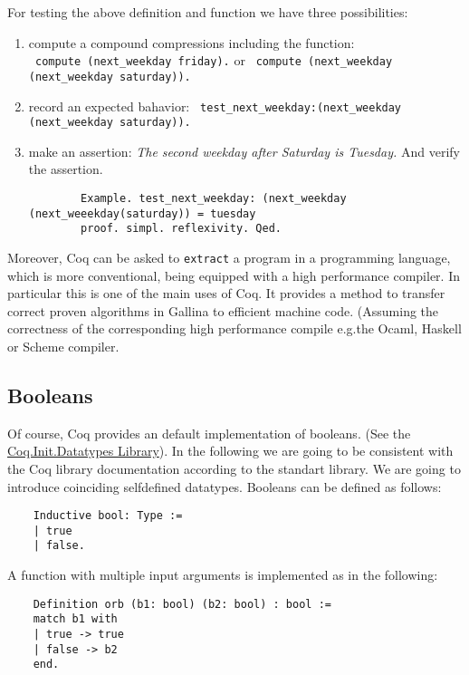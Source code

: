   For testing the above definition and function we have three possibilities:   
   \begin{enumerate}
   \item compute a compound compressions including the function:\\
   \lstinline! compute (next_weekday friday).! or 
   \lstinline! compute (next_weekday (next_weekday saturday)).!
   \item record an expected bahavior: \lstinline! test_next_weekday:(next_weekday (next_weekday saturday)).! 
   \item make an assertion: {\itshape The second weekday after Saturday is Tuesday.} And verify the assertion. 
   
   \begin{lstlisting}
   		Example. test_next_weekday: (next_weekday (next_weeekday(saturday)) = tuesday 
   		proof. simpl. reflexivity. Qed.
   \end{lstlisting}
   
   \end{enumerate}   

    Moreover, Coq can be asked to \lstinline!extract! a program in a programming language, which is more conventional, being equipped with a high performance compiler.
    In particular this is one of the main uses of Coq. 
    It provides a method to transfer correct proven algorithms in Gallina to efficient machine code.
    (Assuming the correctness of the corresponding high performance compile e.g.the Ocaml, Haskell or Scheme compiler. 


\subsection{Booleans}

    Of course, Coq provides an default implementation of booleans. (See the \href{https://www.cs.princeton.edu/courses/archive/fall07/cos595/stdlib/html/Coq.Init.Datatypes.html}{Coq.Init.Datatypes Library}). %
    In the following we are going to be consistent with the Coq library documentation according to the standart library. We are going to introduce coinciding selfdefined datatypes.
    Booleans can be defined as follows:
    
    \label{Def:booleans}
    \begin{lstlisting}    
    Inductive bool: Type :=
    | true
    | false.
    \end{lstlisting}
    
    A function with multiple input arguments is implemented as in the following:
    \begin{lstlisting}
    Definition orb (b1: bool) (b2: bool) : bool :=
    match b1 with
    | true -> true
    | false -> b2
    end.
    \end{lstlisting}
     
